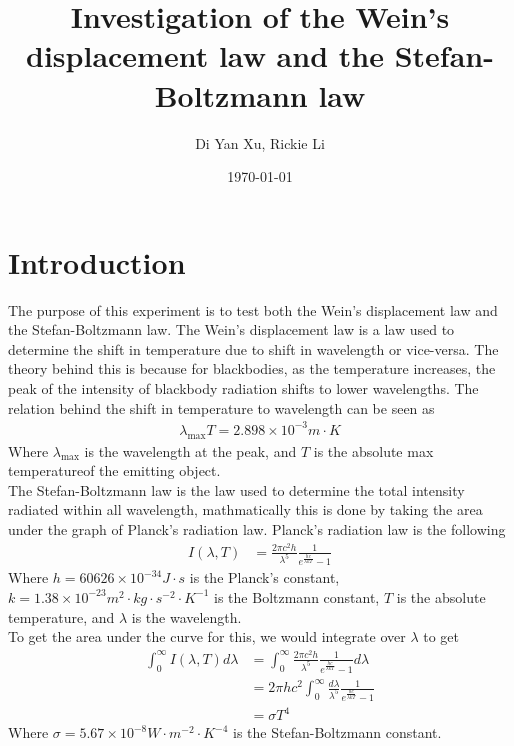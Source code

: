 \documentclass{article}
\title{Investigation of the Wein's displacement law and the Stefan-Boltzmann law}
\author{Di Yan Xu, Rickie Li}
\date{\today}
\begin{document}
\maketitle

\newpage

\section{Introduction}
The purpose of this experiment is to test both the Wein's displacement law and
the Stefan-Boltzmann law. The Wein's displacement law is a law used to determine
the shift in temperature due to shift in wavelength or vice-versa. The theory
behind this is because for blackbodies, as the temperature increases, the peak
of the intensity of blackbody radiation shifts to lower wavelengths. The relation
behind the shift in temperature to wavelength can be seen as
\begin{align*}
    \lambda_{\max}T = 2.898\times10^{-3}m\cdot K
\end{align*}
Where $\lambda_{\max}$ is the wavelength at the peak, and $T$ is the absolute max
temperatureof the emitting object.\\
The Stefan-Boltzmann law is the law used to determine the total intensity radiated
within all wavelength, mathmatically this is done by taking the area under the
graph of Planck's radiation law. Planck's radiation law is the following
\begin{align*}
    I(\lambda, T) &= \frac{2\pi c^2h}{\lambda^5}\frac{1}{e^{\frac{hc}{\lambda kT}} - 1}
\end{align*}
Where $h = 60626\times 10^{-34}J\cdot s$ is the Planck's constant, $k = 1.38
\times 10^{-23}m^2\cdot kg\cdot s^{-2}\cdot K^{-1}$ is the Boltzmann constant,
$T$ is the absolute temperature, and $\lambda$ is the wavelength.\\
To get the area under the curve for this, we would integrate over $\lambda$ to get
\begin{align*}
    \int_0^{\infty}I(\lambda, T) d\lambda &= \int_0^{\infty}
    \frac{2\pi c^2h}{\lambda^5}\frac{1}{e^{\frac{hc}{\lambda kT}} - 1}d\lambda\\
    &= 2\pi hc^2\int_0^{\infty}\frac{d\lambda}{\lambda^5}\frac{1}{e^{\frac{hc}{\lambda kT}} - 1}\\
    &= \sigma T^4
\end{align*}
Where $\sigma = 5.67 \times 10^{-8}W\cdot m^{-2}\cdot K^{-4}$ is the Stefan-Boltzmann
constant.

\newpage
\end{document}

